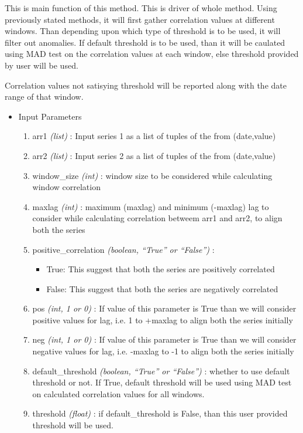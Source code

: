 This is main function of this method. This is driver of whole method. Using 
previously stated methods, it will first gather correlation values at different 
windows. Than depending upon which type of threshold is to be used, it will 
filter out anomalies. If default threshold is to be used, than it will be 
caulated using MAD test on the correlation values at each window, else 
threshold provided by user will be used. 

Correlation values not satisying threshold will be reported along with the date 
range of that window.


\begin{itemize}
 \item Input Parameters
 
 \begin{enumerate}
  \item arr1 \textit{(list)} : Input series 1 as a list of tuples of the from 
(date,value)
  \item arr2 \textit{(list)} : Input series 2 as a list of tuples of the from 
(date,value)
  \item window\_size \textit{(int)} : window size to be considered while 
calculating window correlation
  \item maxlag \textit{(int)} : maximum (maxlag) and minimum (-maxlag) lag to 
consider while calculating correlation betweem arr1 and arr2, to align both the 
series
  \item positive\_correlation \textit{(boolean, ``True'' or ``False'')} : 
      \begin{itemize}
       \item True: This suggest that both the series are positively correlated
       \item False: This suggest that both the series are negatively correlated
      \end{itemize}
      
  \item pos \textit{(int, 1 or 0)} : If value of this parameter is True than we 
will consider positive values for lag, i.e. 1 to +maxlag to align both the 
series initially
  \item neg \textit{(int, 1 or 0)} : If value of this parameter is True than we 
will consider negative values for lag, i.e. -maxlag to -1 to align both the 
series initially
  \item default\_threshold \textit{(boolean, ``True'' or ``False'')} : whether 
to use default threshold or not. If True, default threshold will be used using 
MAD test on calculated correlation values for all windows.
  \item threshold \textit{(float)} : if default\_threshold is False, than this 
user provided threshold will be used.
 \end{enumerate}


\end{itemize}
